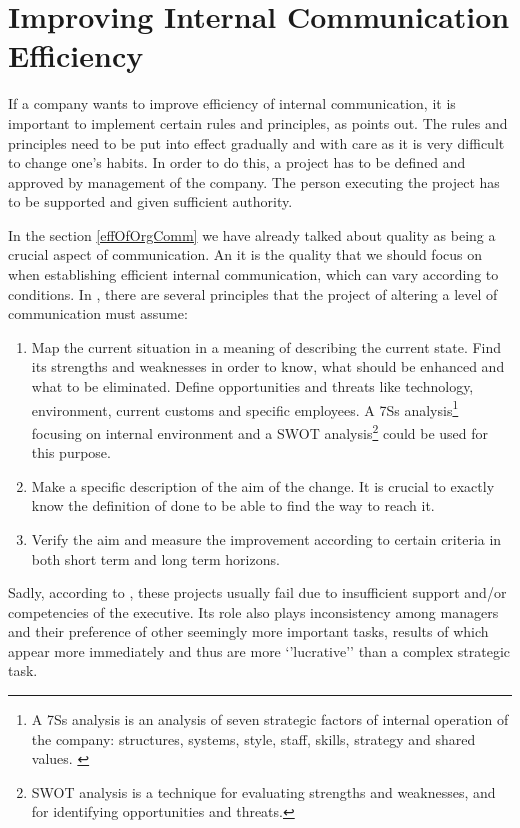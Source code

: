 \documentclass[11pt,singleside]{myfithesis2}
\begin{document}
	\section{Improving Internal Communication Efficiency}
If a company wants to improve efficiency of internal communication, it is important to implement certain rules and principles, as \cite{intCommManag} points out. The rules and principles need to be put into effect gradually and with care as it is very difficult to change one's habits. In order to do this, a project has to be defined and approved by management of the company. The person executing the project has to be supported and given sufficient authority. 

In the section \ref{effOfOrgComm} we have already talked about quality as being a crucial aspect of communication. An it is the quality that we should focus on when establishing efficient internal communication, which can vary according to conditions. In \cite{intCommManag}, there are several principles that the project of altering a level of communication must assume:
\begin{enumerate}
	\item Map the current situation in a meaning of describing the current state. Find its strengths and weaknesses in order to know, what should be enhanced and what to be eliminated. Define opportunities and threats like technology, environment, current customs and specific employees. A 7Ss analysis\footnote{A 7Ss analysis is an analysis of seven strategic factors of internal operation of the company: structures, systems, style, staff, skills, strategy and shared values. \cite{intCommManag}} focusing on internal environment and a SWOT analysis\footnote{SWOT analysis is a technique for evaluating strengths and weaknesses, and for identifying opportunities and threats.} could be used for this purpose.
	\item Make a specific description of the aim of the change. It is crucial to exactly know the definition of done to be able to find the way to reach it.
	\item Verify the aim and measure the improvement according to certain criteria in both short term and long term horizons.
\end{enumerate}

Sadly, according to \cite{intCommManag}, these projects usually fail due to insufficient support and/or competencies of the executive. Its role also plays inconsistency among managers and their preference of other seemingly more important tasks, results of which appear more immediately and thus are more `'lucrative'' than a complex strategic task.
\end{document}
